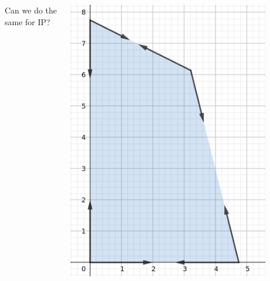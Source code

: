 \documentclass{beamer}
\begin{document}
\begin{frame}
\begin{columns}[T]
\begin{column}{.48\textwidth}
\begin{itemize}
            \vspace{0.5cm}
            Can we do the same for IP?
        \end{itemize}
        \end{column}%
        \hfill%
        \begin{column}{.48\textwidth}
            \includegraphics[width=0.85\textwidth]{images/IP(4).png}
        \end{column}%
        \end{columns}
        
        \addtocounter{framenumber}{-1}

    \end{frame}
\end{document}
